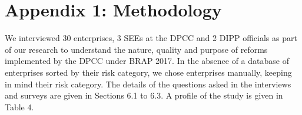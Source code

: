 \documentclass[a4paper, 12pt]{article}
\begin{document}
	\newpage
		\section*{Appendix 1: Methodology}
		
		We interviewed 30 enterprises, 3 SEEs at the DPCC and 2 DIPP officials as part of our research to understand the nature, quality and purpose of reforms implemented by the DPCC under BRAP 2017. In the absence of a database of enterprises sorted by their risk category, we chose enterprises manually, keeping in mind their risk category. The details of the questions asked in the interviews and surveys are given in Sections 6.1 to 6.3. A profile of the study is given in Table 4. \\
		
		
\end{document}
